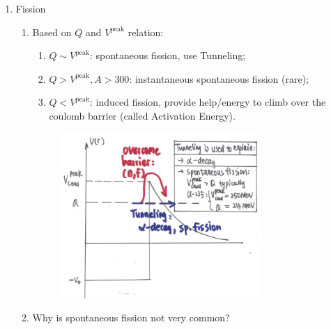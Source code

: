 \documentclass{school-22.101-notes}
\begin{document}
\begin{enumerate}
\item Fission
\begin{enumerate}
\item Based on $Q$ and $V^{\mathrm{peak}}$ relation:
    \begin{enumerate}
    \item $Q \sim V^{\mathrm{peak}}$: spontaneous fission, use Tunneling; 
    \item $Q > V^{\mathrm{peak}}, A>300$: instantaneous spontaneous fission (rare);
    \item $Q < V^{\mathrm{peak}}$: induced fission, provide help/energy to climb over the coulomb barrier (called Activation Energy). 
    \end{enumerate}
    \begin{figure}[ht]
       \centering
       \includegraphics[width=3in]{images/ni/fission-mechanism.png}
    \end{figure}
\item Why is spontaneous fission not very common? 


\end{enumerate}
\end{enumerate}
\end{document}
